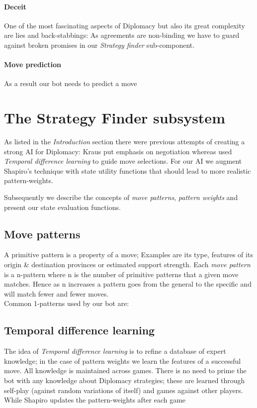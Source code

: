 \documentclass[pdftex,11pt,a4paper]{report}
\begin{document}
\paragraph{Deceit}
One of the most fascinating aspects of Diplomacy but also its great
complexity are lies and back-stabbings: As agreements are non-binding
we have to guard against broken promises in our \textit{Strategy finder}
sub-component. 

\paragraph{Move prediction}
As a result our bot needs to predict a move 

\section{The Strategy Finder subsystem}

As listed in the \textit{Introduction} section there were previous
attempts of creating a strong AI for Diplomacy: Kraus \cite{Kraus95}
put emphasis on negotiation whereas \cite{Shapiro02} used
\textit{Temporal difference learning} to guide move selections. For
our AI we augment Shapiro's technique with state utility functions
that should lead to more realistic pattern-weights.

Subsequently we describe the concepts of \textit{move patterns},
\textit{pattern weights} and present our state evaluation functions.

\subsection{Move patterns}

A primitive pattern is a property of a move; Examples are its type,
features of its origin \& destination provinces or estimated support
strength. Each \textit{move pattern} is a n-pattern where n is the
number of primitive patterns that a given move matches. Hence as n
increases a pattern goes from the general to the specific and will
match fewer and fewer moves. \\

Common 1-patterns used by our bot are:

\subsection{Temporal difference learning}

The idea of \textit{Temporal difference learning} is to refine a
database of expert knowledge; in the case of pattern weights we learn
the features of a successful move. All knowledge is maintained across
games. There is no need to prime the bot with any knowledge about
Diplomacy strategies; these are learned through self-play (against
random variations of itself) and games against other players. While 
Shapiro \cite{Shapiro02} updates the pattern-weights after each game \\
\end{document}
